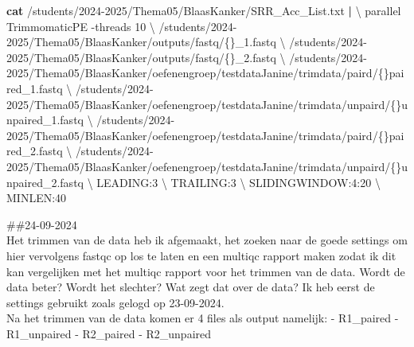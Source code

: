 \documentclass[
]{article}
\newenvironment{Shaded}{\begin{snugshade}}{\end{snugshade}}
\newcommand{\DataTypeTok}[1]{\textcolor[rgb]{0.13,0.29,0.53}{#1}}
\newcommand{\ExtensionTok}[1]{#1}
\newcommand{\FunctionTok}[1]{\textcolor[rgb]{0.13,0.29,0.53}{\textbf{#1}}}
\newcommand{\KeywordTok}[1]{\textcolor[rgb]{0.13,0.29,0.53}{\textbf{#1}}}
\newcommand{\NormalTok}[1]{#1}
\newcommand{\StringTok}[1]{\textcolor[rgb]{0.31,0.60,0.02}{#1}}
\begin{document}
\begin{Shaded}
\begin{Highlighting}[]
\FunctionTok{cat}\NormalTok{ /students/2024{-}2025/Thema05/BlaasKanker/SRR\_Acc\_List.txt }\KeywordTok{|} \DataTypeTok{\textbackslash{}}
    \ExtensionTok{parallel} \StringTok{\textquotesingle{}TrimmomaticPE {-}threads 10\textquotesingle{}} \DataTypeTok{\textbackslash{}}
            \StringTok{\textquotesingle{}/students/2024{-}2025/Thema05/BlaasKanker/outputs/fastq/\{\}\_1.fastq\textquotesingle{}} \DataTypeTok{\textbackslash{}}
            \StringTok{\textquotesingle{}/students/2024{-}2025/Thema05/BlaasKanker/outputs/fastq/\{\}\_2.fastq\textquotesingle{}} \DataTypeTok{\textbackslash{}}
            \StringTok{\textquotesingle{}/students/2024{-}2025/Thema05/BlaasKanker/oefenengroep/testdataJanine/trimdata/paird/\{\}paired\_1.fastq\textquotesingle{}} \DataTypeTok{\textbackslash{}}
            \StringTok{\textquotesingle{}/students/2024{-}2025/Thema05/BlaasKanker/oefenengroep/testdataJanine/trimdata/unpaird/\{\}unpaired\_1.fastq\textquotesingle{}} \DataTypeTok{\textbackslash{}}
            \StringTok{\textquotesingle{}/students/2024{-}2025/Thema05/BlaasKanker/oefenengroep/testdataJanine/trimdata/paird/\{\}paired\_2.fastq\textquotesingle{}} \DataTypeTok{\textbackslash{}}
            \StringTok{\textquotesingle{}/students/2024{-}2025/Thema05/BlaasKanker/oefenengroep/testdataJanine/trimdata/unpaird/\{\}unpaired\_2.fastq\textquotesingle{}} \DataTypeTok{\textbackslash{}}
            \StringTok{\textquotesingle{}LEADING:3\textquotesingle{}} \DataTypeTok{\textbackslash{}}
            \StringTok{\textquotesingle{}TRAILING:3\textquotesingle{}} \DataTypeTok{\textbackslash{}}
            \StringTok{\textquotesingle{}SLIDINGWINDOW:4:20\textquotesingle{}} \DataTypeTok{\textbackslash{}}
            \StringTok{\textquotesingle{}MINLEN:40\textquotesingle{}}
\end{Highlighting}
\end{Shaded}

\#\#24-09-2024\\
Het trimmen van de data heb ik afgemaakt, het zoeken naar de goede
settings om hier vervolgens fastqc op los te laten en een multiqc
rapport maken zodat ik dit kan vergelijken met het multiqc rapport voor
het trimmen van de data. Wordt de data beter? Wordt het slechter? Wat
zegt dat over de data? Ik heb eerst de settings gebruikt zoals gelogd op
23-09-2024.\\

Na het trimmen van de data komen er 4 files als output namelijk: -
R1\_paired - R1\_unpaired - R2\_paired - R2\_unpaired
\end{document}
